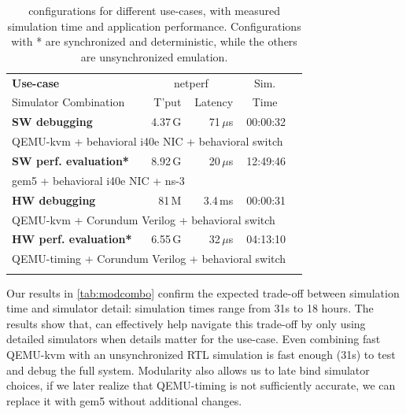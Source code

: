 \begin{table}%
\centering%
\begin{tabular}{lrrrr}%
    \toprule
    \textbf{Use-case} & \multicolumn{2}{c}{netperf} &
        \multicolumn{1}{c}{Sim.} \\
    Simulator Combination & T'put & Latency &
        \multicolumn{1}{c}{Time} \\
    \midrule

    \textbf{SW debugging} & 4.37\,G & 71\,$\mu$s & 00:00:32 \\
    \multicolumn{4}{l}{QEMU-kvm + behavioral i40e NIC + behavioral
      switch} \\[.3em]

    \textbf{SW perf. evaluation*} & 8.92\,G & 20\,$\mu$s & 12:49:46  \\
    \multicolumn{4}{l}{gem5 + behavioral i40e NIC + ns-3} \\[.3em]

    \textbf{HW debugging} & 81\,M & 3.4\,ms & 00:00:31 \\
    \multicolumn{4}{l}{QEMU-kvm + Corundum Verilog + behavioral
      switch} \\[.3em]

    \textbf{HW perf. evaluation*} & 6.55\,G & 32\,$\mu$s & 04:13:10 \\
    \multicolumn{4}{l}{QEMU-timing + Corundum Verilog + behavioral
      switch}\\
    \bottomrule\\
\end{tabular}%
\caption{\sysname configurations for different use-cases, with
    measured simulation time and application performance.
    Configurations with * are synchronized and deterministic, while
    the others are unsynchronized emulation.}%
\label{tab:modcombo}%
\vspace{-5mm}%
\end{table}

Our results in \autoref{tab:modcombo} confirm the expected trade-off between
simulation time and simulator detail: simulation times range from 31s to 18
hours.
%
The results show that, \sysname can effectively help navigate this trade-off by
only using detailed simulators when details matter for the use-case.
%
Even combining fast QEMU-kvm with an unsynchronized RTL simulation is
fast enough (31s) to test and debug the full system.
%
Modularity also allows us to late bind simulator choices, \eg if we
later realize that QEMU-timing is not sufficiently accurate, we can
replace it with gem5 without additional changes.


